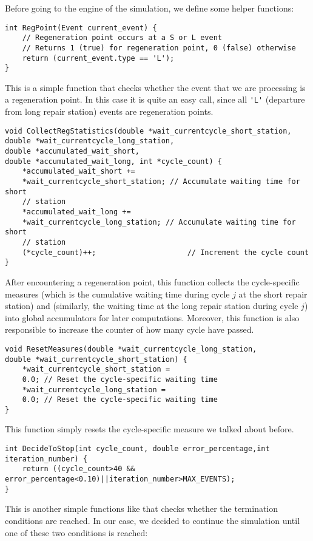 \documentclass[12pt]{article}
\begin{document}
Before going to the engine of the simulation, we define some helper functions:
\begin{lstlisting}
int RegPoint(Event current_event) {
	// Regeneration point occurs at a S or L event
	// Returns 1 (true) for regeneration point, 0 (false) otherwise
	return (current_event.type == 'L');
}
\end{lstlisting}
This is a simple function that checks whether the event that we are processing is a regeneration point. In this case it is quite an easy call, since all \verb*|'L'| (departure from long repair station) events are regeneration points.
\begin{lstlisting}
void CollectRegStatistics(double *wait_currentcycle_short_station,
double *wait_currentcycle_long_station,
double *accumulated_wait_short,
double *accumulated_wait_long, int *cycle_count) {
	*accumulated_wait_short +=
	*wait_currentcycle_short_station; // Accumulate waiting time for short
	// station
	*accumulated_wait_long +=
	*wait_currentcycle_long_station; // Accumulate waiting time for short
	// station
	(*cycle_count)++;                     // Increment the cycle count
}
\end{lstlisting}
After encountering a regeneration point, this function collects the cycle-specific measures  (which is the cumulative waiting time during cycle $j$ at the short repair station) and  (similarly, the waiting time at the long repair station during cycle $j$) into global accumulators for later computations. Moreover, this function is also responsible to increase the counter of how many cycle have passed.
\begin{lstlisting}
void ResetMeasures(double *wait_currentcycle_long_station,
double *wait_currentcycle_short_station) {
	*wait_currentcycle_short_station =
	0.0; // Reset the cycle-specific waiting time
	*wait_currentcycle_long_station =
	0.0; // Reset the cycle-specific waiting time
}
\end{lstlisting}
This function simply resets the cycle-specific measure we talked about before.
\begin{lstlisting}
int DecideToStop(int cycle_count, double error_percentage,int iteration_number) {
	return ((cycle_count>40 && error_percentage<0.10)||iteration_number>MAX_EVENTS);
}
\end{lstlisting}
This is another simple functions like  that checks whether the termination conditions are reached. In our case, we decided to continue the simulation until one of these two conditions is reached:
\end{document}
